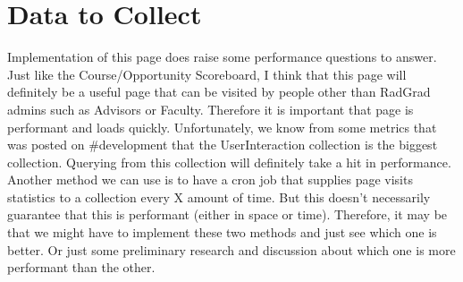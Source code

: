 \documentclass[english]{proposalnsf}
\begin{document}
    \section{Data to Collect}
    \label{sec:data-to-collect}
    Implementation of this page does raise some performance questions to answer.
    Just like the Course/Opportunity Scoreboard, I think that this page will definitely be a useful page that can be visited by people other than RadGrad admins such as Advisors or Faculty.
    Therefore it is important that page is performant and loads quickly.
    Unfortunately, we know from some metrics that was posted on #development that the UserInteraction collection is the biggest collection.
    Querying from this collection will definitely take a hit in performance.
    Another method we can use is to have a cron job that supplies page visits statistics to a collection every X amount of time.
    But this doesn't necessarily guarantee that this is performant (either in space or time).
    Therefore, it may be that we might have to implement these two methods and just see which one is better.
    Or just some preliminary research and discussion about which one is more performant than the other.

    
    

    \appendix
\end{document}
